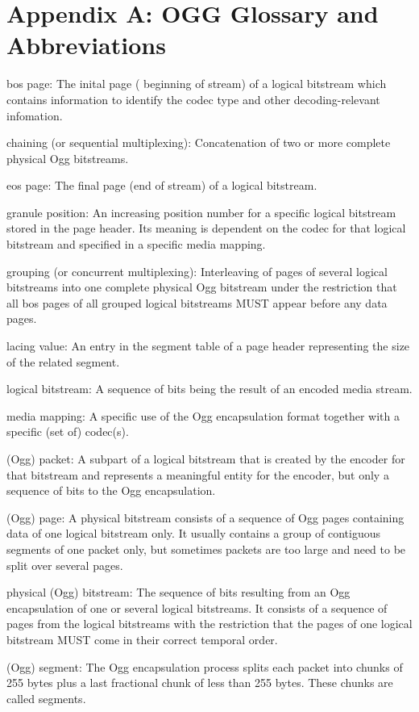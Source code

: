\section*{Appendix A: OGG Glossary and Abbreviations}
\label{appendixa}

   \hspace{1cm}bos page: The inital page ( beginning of stream) of a logical bitstream 
       which contains information to identify the codec type and other decoding-relevant infomation.

   chaining (or sequential multiplexing): Concatenation of two or more
      complete physical Ogg bitstreams.

   eos page: The final page (end of stream) of a logical bitstream.

   granule position: An increasing position number for a specific
      logical bitstream stored in the page header.  Its meaning is
      dependent on the codec for that logical bitstream and specified in
      a specific media mapping.

   grouping (or concurrent multiplexing): Interleaving of pages of
      several logical bitstreams into one complete physical Ogg
      bitstream under the restriction that all bos pages of all grouped
      logical bitstreams MUST appear before any data pages.

   lacing value: An entry in the segment table of a page header
      representing the size of the related segment.

   logical bitstream: A sequence of bits being the result of an encoded
      media stream.

   media mapping: A specific use of the Ogg encapsulation format
      together with a specific (set of) codec(s).

   (Ogg) packet: A subpart of a logical bitstream that is created by the
      encoder for that bitstream and represents a meaningful entity for
      the encoder, but only a sequence of bits to the Ogg encapsulation.

   (Ogg) page: A physical bitstream consists of a sequence of Ogg pages
      containing data of one logical bitstream only.  It usually
      contains a group of contiguous segments of one packet only, but
      sometimes packets are too large and need to be split over several
      pages.

   physical (Ogg) bitstream: The sequence of bits resulting from an Ogg
      encapsulation of one or several logical bitstreams.  It consists
      of a sequence of pages from the logical bitstreams with the
      restriction that the pages of one logical bitstream MUST come in
      their correct temporal order.

   (Ogg) segment: The Ogg encapsulation process splits each packet into
      chunks of 255 bytes plus a last fractional chunk of less than 255
      bytes.  These chunks are called segments.
